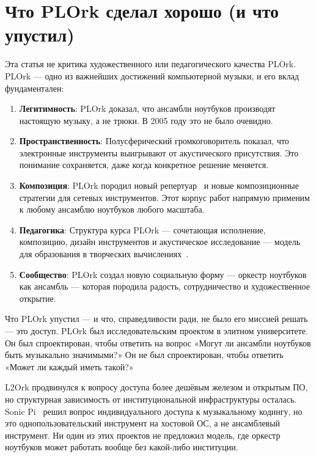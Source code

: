\documentclass[10pt,letterpaper,twocolumn]{article}
\begin{document}

\section{Что PLOrk сделал хорошо (и что упустил)}
\label{sec:lessons}

Эта статья не критика художественного или педагогического качества PLOrk. PLOrk --- одно из важнейших достижений компьютерной музыки, и его вклад фундаментален:

\begin{enumerate}
  \item \textbf{Легитимность}: PLOrk доказал, что ансамбли ноутбуков производят настоящую музыку, а не трюки. В 2005 году это не было очевидно.
  \item \textbf{Пространственность}: Полусферический громкоговоритель показал, что электронные инструменты выигрывают от акустического присутствия. Это понимание сохраняется, даже когда конкретное решение меняется.
  \item \textbf{Композиция}: PLOrk породил новый репертуар~\citep{smallwood2008composing} и новые композиционные стратегии для сетевых инструментов. Этот корпус работ напрямую применим к любому ансамблю ноутбуков любого масштаба.
  \item \textbf{Педагогика}: Структура курса PLOrk --- сочетающая исполнение, композицию, дизайн инструментов и акустическое исследование --- модель для образования в творческих вычислениях~\citep{trueman2007why}.
  \item \textbf{Сообщество}: PLOrk создал новую социальную форму --- оркестр ноутбуков как ансамбль --- которая породила радость, сотрудничество и художественное открытие.
\end{enumerate}

Что PLOrk упустил --- и что, справедливости ради, не было его миссией решать --- это доступ. PLOrk был исследовательским проектом в элитном университете. Он был спроектирован, чтобы ответить на вопрос «Могут ли ансамбли ноутбуков быть музыкально значимыми?» Он не был спроектирован, чтобы ответить «Может ли каждый иметь такой?»

L2Ork продвинулся к вопросу доступа более дешёвым железом и открытым ПО, но структурная зависимость от институциональной инфраструктуры осталась. Sonic Pi~\citep{aaron2016sonic} решил вопрос индивидуального доступа к музыкальному кодингу, но это однопользовательский инструмент на хостовой ОС, а не ансамблевый инструмент. Ни один из этих проектов не предложил модель, где оркестр ноутбуков может работать вообще без какой-либо институции.
\end{document}
